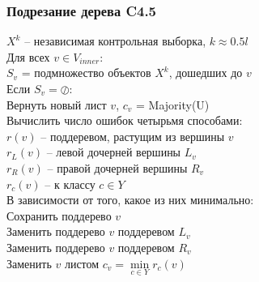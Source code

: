 \documentclass[12pt]{beamer}
\begin{document}
\begin{frame}\frametitle{Подрезание дерева C4.5}
$X^k$ -- независимая контрольная выборка, $k \approx 0.5l$\\
Для всех $v \in V_{inner}$:\\
\hspace{10mm} $S_v$ = подмножество объектов $X^k$, дошедших до $v$\\
\hspace{10mm} Если $S_v = \oslash$:\\
\hspace{20mm} Вернуть новый лист $v$, $c_v$ = Majority(U)\\
\hspace{10mm} Вычислить число ошибок четырьмя способами:\\
\hspace{20mm} $r(v)$ -- поддеревом, растущим из вершины $v$\\
\hspace{20mm} $r_L(v)$ -- левой дочерней вершины $L_v$\\
\hspace{20mm} $r_R(v)$ -- правой дочерней вершины $R_v$\\
\hspace{20mm} $r_c(v)$ -- к классу $c \in Y$\\
\hspace{10mm} В зависимости от того, какое из них минимально:\\
\hspace{20mm} Сохранить поддерево $v$\\
\hspace{20mm} Заменить поддерево $v$ поддеревом $L_v$\\
\hspace{20mm} Заменить поддерево $v$ поддеревом $R_v$\\
\hspace{20mm} Заменить $v$ листом $c_v = \min\limits_{c \in Y} r_c(v)$\\
\end{frame}

\end{document}
